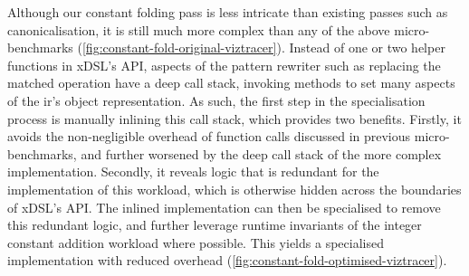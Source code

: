 Although our constant folding pass is less intricate than existing passes such as canonicalisation, it is still much more complex than any of the above micro-benchmarks (\autoref{fig:constant-fold-original-viztracer}).
Instead of one or two helper functions in xDSL's API, aspects of the pattern rewriter such as replacing the matched operation have a deep call stack, invoking methods to set many aspects of the \ac{ir}'s object representation.
As such, the first step in the specialisation process is manually inlining this call stack, which provides two benefits. Firstly, it avoids the non-negligible overhead of function calls discussed in previous micro-benchmarks, and further worsened by the deep call stack of the more complex implementation. Secondly, it reveals logic that is redundant for the implementation of this workload, which is otherwise hidden across the boundaries of xDSL's API.
The inlined implementation can then be specialised to remove this redundant logic, and further leverage runtime invariants of the integer constant addition workload where possible.
This yields a specialised implementation with reduced overhead (\autoref{fig:constant-fold-optimised-viztracer}).


